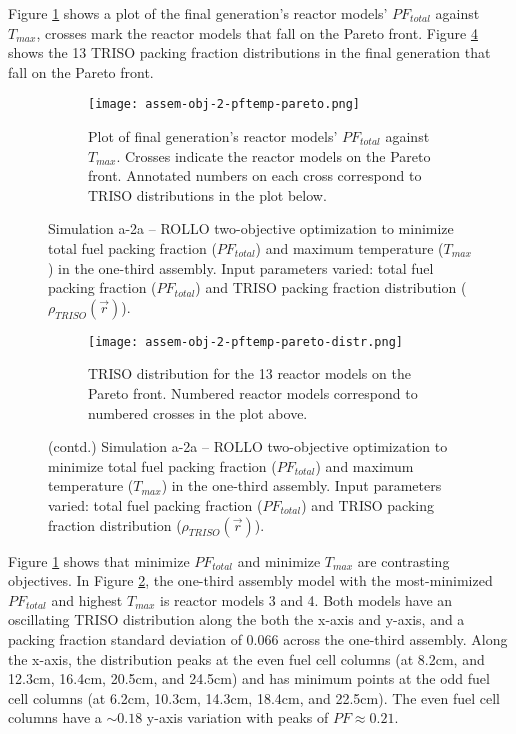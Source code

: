 Figure \ref{fig:assem-obj-2-pftemp-pareto} shows a plot of the final generation's reactor 
models' $PF_{total}$ against $T_{max}$, crosses mark the reactor models that fall on 
the Pareto front.
Figure \ref{fig:assem-obj-2-pftemp-pareto-distr} shows the 13 TRISO packing fraction 
distributions in the final generation that fall on the Pareto front. 
\begin{figure}[htbp!]
    \begin{subfigure}{\textwidth}
        \centering
        \texttt{[image: assem-obj-2-pftemp-pareto.png]}
        \caption{Plot of final generation's reactor models' $PF_{total}$ against 
        $T_{max}$. 
        Crosses indicate the reactor models on the Pareto front. Annotated numbers 
        on each cross correspond to TRISO distributions in the plot below.}
        \label{fig:assem-obj-2-pftemp-pareto} 
    \end{subfigure}
    \caption{Simulation a-2a -- ROLLO two-objective optimization to minimize total fuel 
    packing fraction ($PF_{total}$) and maximum temperature ($T_{max}$) in 
    the one-third assembly. 
    Input parameters varied: total fuel packing fraction ($PF_{total}$) and TRISO 
    packing fraction distribution ($\rho_{TRISO}(\vec{r})$).}
    \label{fig:assem-obj-2-pftemp}
\end{figure}
\begin{figure}[htbp!]
    \ContinuedFloat
    \begin{subfigure}{\textwidth}
        \centering
        \texttt{[image: assem-obj-2-pftemp-pareto-distr.png]}
        \caption{TRISO distribution for the 13 reactor models on the Pareto front.
        Numbered reactor models correspond to numbered crosses in the plot above. }
        \label{fig:assem-obj-2-pftemp-pareto-distr} 
    \end{subfigure}
    \caption{(contd.) Simulation a-2a -- ROLLO two-objective optimization to minimize total fuel 
    packing fraction ($PF_{total}$) and maximum temperature ($T_{max}$) in 
    the one-third assembly. 
    Input parameters varied: total fuel packing fraction ($PF_{total}$) and TRISO 
    packing fraction distribution ($\rho_{TRISO}(\vec{r})$).}
\end{figure}

Figure \ref{fig:assem-obj-2-pftemp-pareto} shows that minimize $PF_{total}$ and 
minimize $T_{max}$ are contrasting objectives. 
In Figure \ref{fig:assem-obj-2-pftemp}, the one-third assembly model with the 
most-minimized $PF_{total}$ and highest $T_{max}$ is reactor models 3 and 4. 
Both models have an oscillating TRISO distribution along the both the 
x-axis and y-axis, and a packing fraction standard deviation of $0.066$ across the 
one-third assembly. 
Along the x-axis, the distribution peaks at the even fuel cell columns (at 8.2cm,  
and 12.3cm, 16.4cm, 20.5cm, and 24.5cm) and has minimum points at the odd fuel cell 
columns (at 6.2cm, 10.3cm, 14.3cm, 18.4cm, and 22.5cm).
The even fuel cell columns have a $\sim0.18$ y-axis variation with peaks of 
$PF\approx0.21$. 

